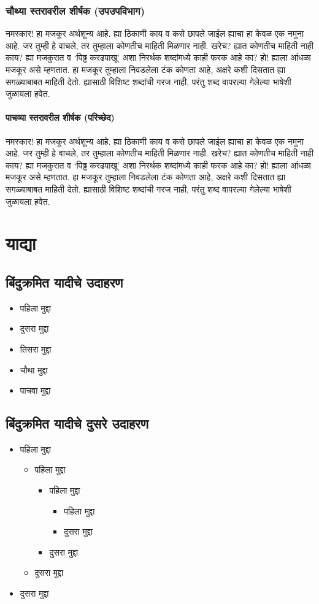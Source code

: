 \subsubsection{चौथ्या स्तरावरील शीर्षक (उपउपविभाग)}
नमस्कार! हा मजकूर अर्थशून्य आहे. ह्या ठिकाणी काय व कसे छापले जाईल ह्याचा हा केवळ एक नमुना आहे. जर तुम्ही हे वाचले, तर तुम्हाला कोणतीच माहिती मिळणार नाही. खरेच? ह्यात कोणतीच माहिती नाही काय? ह्या मजकुरात व `पिढ्ढ करढपाखू' अशा निरर्थक शब्दांमध्ये काही फरक आहे का? हो! ह्याला आंधळा मजकूर असे म्हणतात. हा मजकूर तुम्हाला निवडलेला टंक कोणता आहे, अक्षरे कशी दिसतात ह्या सगळ्याबाबत माहिती देतो. ह्यासाठी विशिष्ट शब्दांची गरज नाही, परंतु शब्द वापरल्या गेलेल्या भाषेशी जुळायला हवेत.
\paragraph{पाचव्या स्तरावरील शीर्षक (परिच्छेद)}
नमस्कार! हा मजकूर अर्थशून्य आहे. ह्या ठिकाणी काय व कसे छापले जाईल ह्याचा हा केवळ एक नमुना आहे. जर तुम्ही हे वाचले, तर तुम्हाला कोणतीच माहिती मिळणार नाही. खरेच? ह्यात कोणतीच माहिती नाही काय? ह्या मजकुरात व `पिढ्ढ करढपाखू' अशा निरर्थक शब्दांमध्ये काही फरक आहे का? हो! ह्याला आंधळा मजकूर असे म्हणतात. हा मजकूर तुम्हाला निवडलेला टंक कोणता आहे, अक्षरे कशी दिसतात ह्या सगळ्याबाबत माहिती देतो. ह्यासाठी विशिष्ट शब्दांची गरज नाही, परंतु शब्द वापरल्या गेलेल्या भाषेशी जुळायला हवेत.
\section{याद्या}
\subsection{बिंदुक्रमित यादीचे उदाहरण}
\begin{itemize}
\item पहिला मुद्दा
\item दुसरा मुद्दा
\item तिसरा मुद्दा
\item चौथा मुद्दा
\item पाचवा मुद्दा
\end{itemize}
\subsection*{बिंदुक्रमित यादीचे दुसरे उदाहरण}
\begin{itemize}
\item पहिला मुद्दा
\begin{itemize}
\item पहिला मुद्दा
\begin{itemize}
\item पहिला मुद्दा
\begin{itemize}
\item पहिला मुद्दा
\item दुसरा मुद्दा
\end{itemize}
\item दुसरा मुद्दा
\end{itemize}
\item दुसरा मुद्दा
\end{itemize}
\item दुसरा मुद्दा
\end{itemize}
